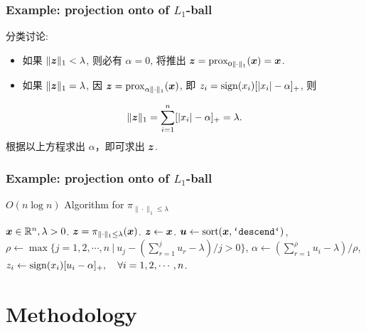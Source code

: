 \documentclass{beamer}
\begin{document}
\begin{frame}[fragile]
    \frametitle{Example: projection onto of $L_1$-ball}
    分类讨论:
    \begin{itemize}
        \item 如果 $\|{\bm z}\|_1<\lambda$, 则必有 $\alpha=0$, 将推出 ${\bm z}=\mathrm{prox}_{0\|\cdot\|_1}({\bm x})={\bm x}$.
        \item 如果 $\|{\bm z}\|_1=\lambda$, 因 ${\bm z}=\mathrm{prox}_{\alpha\|\cdot\|_1}({\bm x})$, 即 $z_i=\mathrm{sign}(x_i)[|x_i|-\alpha]_+$, 则
    \end{itemize}
    \begin{equation}
        \|{\bm z}\|_1=\sum_{i=1}^n[|x_i|-\alpha]_+=\lambda.
    \end{equation}
    根据以上方程求出 $\alpha$，即可求出 ${\bm z}$.
\end{frame}

\begin{frame}[fragile]
    \frametitle{Example: projection onto of $L_1$-ball}
    \begin{algorithm}[H]
        \caption{$O(n\log n)$ Algorithm for $\pi_{\|\cdot\|_1\leq\lambda}$}
        \begin{algorithmic}[1]
            \REQUIRE ${\bm x}\in{\mathbb R}^n,\lambda>0$.
            \ENSURE ${\bm z}=\pi_{\|\cdot\|_1\leq\lambda}({\bm x})$.
            \IF {$\|\x\|_1\leq\lambda$}
                \STATE ${\bm z}\leftarrow{\bm x}$.
            \ELSE
                \STATE $\ubf\leftarrow\mathrm{sort}(\x,\verb+`descend`+)$,
                \STATE $\rho\leftarrow\max\{j=1,2,\cdots,n~|~ u_j-(\sum_{r=1}^ju_r-\lambda)/j>0\}$,
                \STATE $\alpha\leftarrow(\sum_{r=1}^{\rho}u_i-\lambda)/\rho$,
                \STATE $z_i\leftarrow\mathrm{sign}(x_i)[u_i-\alpha]_+,\quad\forall i=1,2,\cdots,n$.
            \ENDIF
        \end{algorithmic}
    \end{algorithm}
\end{frame}


\section{Methodology}
\end{document}
